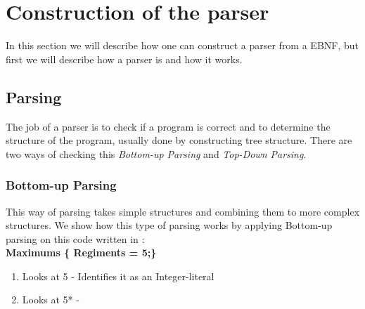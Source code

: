 \section{Construction of the parser}
	In this section we will describe how one can construct a parser from a EBNF, but first we will describe how a parser is and how it works.
	
	\subsection{Parsing}
		The job of a parser is to check if a program is correct and 
		to determine the structure of the program, usually done by constructing tree structure.
		There are two ways of checking this {\it Bottom-up Parsing} and {\it Top-Down Parsing}.
		
		\subsubsection*{Bottom-up Parsing}
			This way of parsing takes simple structures and combining them to more complex structures.
			We show how this type of parsing works by applying Bottom-up parsing on this code written in : \\
			{\bf Maximums \{ Regiments = 5;\} }
			
			\begin{enumerate}
				\item Looks at 5 - Identifies it as an Integer-literal
				\item Looks at 5* -
			\end{enumerate}
			